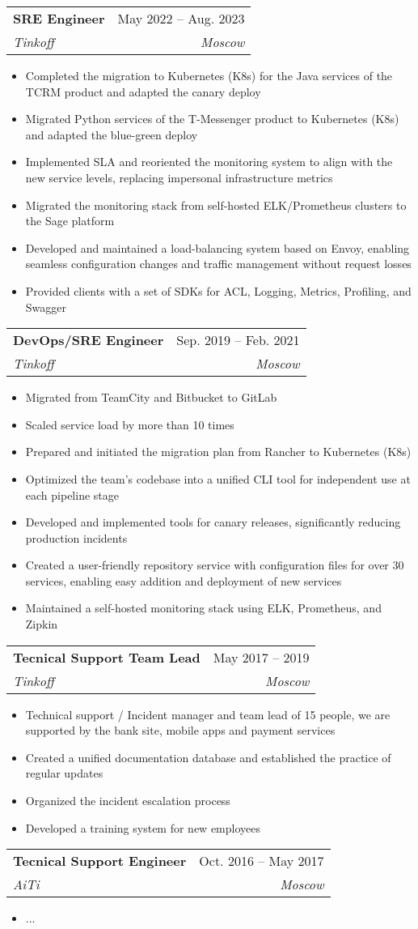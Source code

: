\documentclass[letterpaper,11pt]{article}
\makeatletter
\newcommand{\resumeItem}[1]{
  \item\small{
    {#1 \vspace{-2pt}}
  }
}
\newcommand{\resumeSubheading}[4]{
  \vspace{-2pt}\item
    \begin{tabular*}{0.97\textwidth}[t]{l@{\extracolsep{\fill}}r}
      \textbf{#1} & #2 \\
      \textit{\small#3} & \textit{\small #4} \\
    \end{tabular*}\vspace{-7pt}
}
\newcommand{\resumeItemListStart}{\begin{itemize}}
\newcommand{\resumeItemListEnd}{\end{itemize}\vspace{-5pt}}
\makeatother
\begin{document}
    \resumeSubheading
      {SRE Engineer}{May 2022 -- Aug. 2023}
      {Tinkoff}{Moscow}
      \resumeItemListStart
        \resumeItem{Completed the migration to Kubernetes (K8s) for the Java services of the TCRM product and adapted the canary deploy}
        \resumeItem{Migrated Python services of the T-Messenger product to Kubernetes (K8s) and adapted the blue-green deploy}
        \resumeItem{Implemented SLA and reoriented the monitoring system to align with the new service levels, replacing impersonal infrastructure metrics}
        \resumeItem{Migrated the monitoring stack from self-hosted ELK/Prometheus clusters to the Sage platform}
        \resumeItem{Developed and maintained a load-balancing system based on Envoy, enabling seamless configuration changes and traffic management without request losses}
        \resumeItem{Provided clients with a set of SDKs for ACL, Logging, Metrics, Profiling, and Swagger}
    \resumeItemListEnd
    \resumeSubheading
      {DevOps/SRE Engineer}{Sep. 2019 -- Feb. 2021}
      {Tinkoff}{Moscow}
      \resumeItemListStart
        \resumeItem{Migrated from TeamCity and Bitbucket to GitLab}
        \resumeItem{Scaled service load by more than 10 times}
        \resumeItem{Prepared and initiated the migration plan from Rancher to Kubernetes (K8s)}
        \resumeItem{Optimized the team's codebase into a unified CLI tool for independent use at each pipeline stage}
        \resumeItem{Developed and implemented tools for canary releases, significantly reducing production incidents}
        \resumeItem{Created a user-friendly repository service with configuration files for over 30 services, enabling easy addition and deployment of new services}
        \resumeItem{Maintained a self-hosted monitoring stack using ELK, Prometheus, and Zipkin}
    \resumeItemListEnd
    \resumeSubheading
      {Tecnical Support Team Lead}{May 2017 -- 2019}
      {Tinkoff}{Moscow}
      \resumeItemListStart
        \resumeItem{Technical support / Incident manager and team lead of 15 people, we are supported by the bank site, mobile apps and payment services}
        \resumeItem{Created a unified documentation database and established the practice of regular updates}
        \resumeItem{Organized the incident escalation process}
        \resumeItem{Developed a training system for new employees}
    \resumeItemListEnd

    \resumeSubheading
      {Tecnical Support Engineer}{Oct. 2016 -- May 2017}
      {AiTi}{Moscow}
      \resumeItemListStart
        \resumeItem{...}
      \resumeItemListEnd
\end{document}
